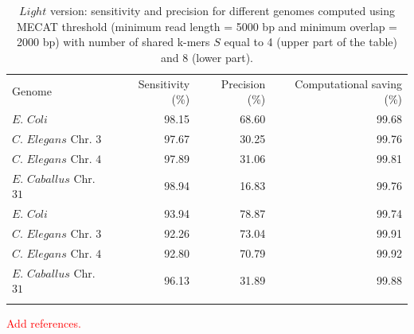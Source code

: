 \documentclass[11pt]{article}
\newcommand\myworries[1]{\textcolor{red}{#1}}
\begin{document}
\begin{table}
\centering
\begin{tabular*}{\textwidth}{l @{\extracolsep{\fill}} rrr}
\hline %
\addlinespace[1ex]Genome & Sensitivity (\%) & Precision (\%) & Computational saving (\%) \\ 
\addlinespace[1ex]\hline %
\addlinespace[0.8ex] $E.$ $Coli$ & 98.15 & 68.60 & 99.68 \\ 
\addlinespace[0.8ex] $C.$ $Elegans$ Chr. $3$ & 97.67 & 30.25 & 99.76 \\
\addlinespace[0.8ex] $C.$ $Elegans$ Chr. $4$ & 97.89 & 31.06 & 99.81 \\
\addlinespace[0.8ex] $E.$ $Caballus$ Chr. $31$ & 98.94 & 16.83 & 99.76 \\
\addlinespace[1ex]\hline
\addlinespace[0.8ex] $E.$ $Coli$ & 93.94 & 78.87 & 99.74 \\ 
\addlinespace[0.8ex] $C.$ $Elegans$ Chr. $3$ & 92.26 & 73.04 & 99.91 \\
\addlinespace[0.8ex] $C.$ $Elegans$ Chr. $4$ & 92.80 & 70.79 & 99.92 \\
\addlinespace[0.8ex] $E.$ $Caballus$ Chr. $31$ & 96.13 & 31.89 & 99.88 \\
\addlinespace[1ex]\hline
\end{tabular*}
\caption{$Light$ version: sensitivity and precision for different genomes computed using MECAT threshold (minimum read length = 5000 bp and minimum overlap = 2000 bp) with number of shared k-mers $S$ equal to 4 (upper part of the table) and 8 (lower part).}
\label{table:mecat}
\end{table}

\myworries{Add references.}
\clearpage
\end{document}
